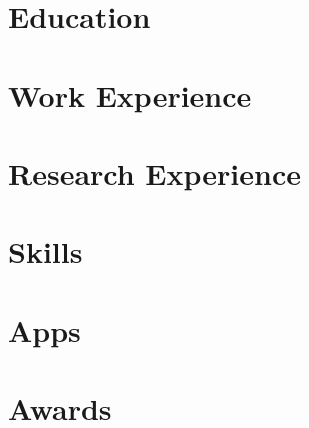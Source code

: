 \documentclass[11pt,a4paper]{mycv}
\begin{document}
\cfoot{\sansc \thepage}
\makecvtitle

\section{Education}


\section{Work Experience}


\section{Research Experience}


\section{Skills}


\section{Apps}


\begingroup
\setlength\bibitemsep{2ex}
\printbibliography[title=Papers, nottype=unpublished]
\endgroup

\begingroup
\setlength\bibitemsep{2ex}
\printbibliography[title=Talks, type=unpublished]
\endgroup


\section{Awards}

\end{document}
